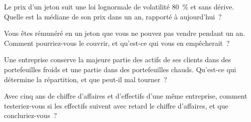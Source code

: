 \begin{interviewq}\label{iq:in:crypto-native-firms:3}
Le prix d'un jeton suit une loi lognormale de volatilité 80~\% et sans dérive. Quelle est la médiane de son prix dans un an, rapporté
à aujourd'hui~?
\end{interviewq}

\begin{interviewq}\label{iq:in:crypto-native-firms:4}
Vous êtes rémunéré en un jeton que vous ne pouvez pas vendre pendant un an. Comment pourriez-vous le couvrir, et qu'est-ce qui vous en empêcherait~?
\end{interviewq}

\begin{interviewq}\label{iq:in:crypto-native-firms:5}
Une entreprise conserve la majeure partie des actifs de ses clients dans des portefeuilles froids et une partie dans des portefeuilles chauds. Qu'est-ce qui détermine la répartition, et que peut-il mal tourner~?
\end{interviewq}

\begin{interviewq}\label{iq:in:crypto-native-firms:6}
Avec cinq ans de chiffre d'affaires et d'effectifs d'une même entreprise, comment testeriez-vous si les effectifs suivent avec retard le chiffre d'affaires, et
que concluriez-vous~?
\end{interviewq}

